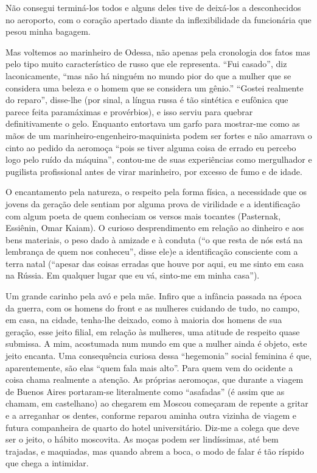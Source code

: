 Não consegui terminá-los todos e alguns deles tive de deixá-los a
desconhecidos no aeroporto, com o coração apertado diante da
inflexibilidade da funcionária que pesou minha bagagem.

Mas voltemos ao marinheiro de Odessa, não apenas pela cronologia dos
fatos mas pelo tipo muito característico de russo que ele representa.
``Fui casado'', diz laconicamente, ``mas não há ninguém no mundo pior do
que a mulher que se considera uma beleza e o homem que se considera um
gênio.'' ``Gostei realmente do reparo'', disse-lhe (por sinal, a língua
russa é tão sintética e eufônica que parece feita paramáximas e
provérbios), e isso serviu para quebrar definitivamente o gelo. Enquanto
entortava um garfo para mostrar-me como as mãos de um
marinheiro-engenheiro-maquinista podem ser fortes e não amarrava o cinto
ao pedido da aeromoça ``pois se tiver alguma coisa de errado eu percebo
logo pelo ruído da máquina'', contou-me de suas experiências como
mergulhador e pugilista profissional antes de virar marinheiro, por
excesso de fumo e de idade.

O encantamento pela natureza, o respeito pela forma física, a
necessidade que os jovens da geração dele sentiam por alguma prova de
virilidade e a identificação com algum poeta de quem conheciam os versos
mais tocantes (Pasternak, Essiênin, Omar Kaiam). O curioso
desprendimento em relação ao dinheiro e aos bens materiais, o peso dado
à amizade e à conduta (``o que resta de nós está na lembrança de quem
nos conheceu'', disse ele)e a identificação consciente com a terra natal
(``apesar das coisas erradas que houve por aqui, eu me sinto em casa na
Rússia. Em qualquer lugar que eu vá, sinto-me em minha casa'').

Um grande carinho pela avó e pela mãe. Infiro que a infância passada na
época da guerra, com os homens do front e as mulheres cuidando de tudo,
no campo, em casa, na cidade, tenha-lhe deixado, como à maioria dos
homens de sua geração, esse jeito filial, em relação às mulheres, uma
atitude de respeito quase submissa. A mim, acostumada num mundo em que a
mulher ainda é objeto, este jeito encanta. Uma consequência curiosa
dessa ``hegemonia'' social feminina é que, aparentemente, são elas
``quem fala mais alto''. Para quem vem do ocidente a coisa chama
realmente a atenção. As próprias aeromoças, que durante a viagem de
Buenos Aires portaram-se literalmente como ``asafadas'' (é assim que as
chamam, em castelhano) ao chegarem em Moscou começaram de repente a
gritar e a arreganhar os dentes, conforme reparou aminha outra vizinha
de viagem e futura companheira de quarto do hotel universitário. Diz-me
a colega que deve ser o jeito, o hábito moscovita. As moças podem ser
lindíssimas, até bem trajadas, e maquiadas, mas quando abrem a boca, o
modo de falar é tão ríspido que chega a intimidar.

